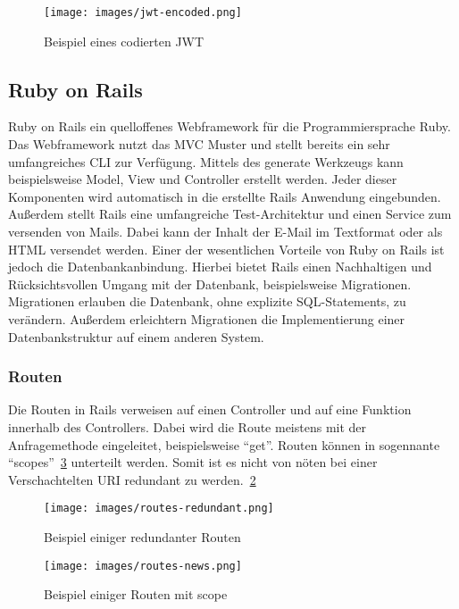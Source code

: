 \documentclass[11pt]{article}
\begin{document}
	\begin{figure}[h]
		\texttt{[image: images/jwt-encoded.png]}
		\caption{Beispiel eines codierten \gls{JWT} }
		\label{fig:jwt-encoded}
	\end{figure}
	
	\subsection{Ruby on Rails}
	\label{sec: rails}
	Ruby on Rails ein quelloffenes Webframework für die Programmiersprache Ruby. Das Webframework nutzt das \gls{MVC} Muster und stellt bereits ein sehr umfangreiches \gls{CLI} zur Verfügung. Mittels des generate Werkzeugs kann beispielsweise Model, View und Controller erstellt werden. Jeder dieser Komponenten wird automatisch in die erstellte Rails Anwendung eingebunden. Außerdem stellt Rails eine umfangreiche Test-Architektur und einen Service zum versenden von Mails. Dabei kann der Inhalt der E-Mail im Textformat oder als \gls{HTML} versendet werden. Einer der wesentlichen Vorteile von Ruby on Rails ist jedoch die Datenbankanbindung. Hierbei bietet Rails einen Nachhaltigen und Rücksichtsvollen Umgang mit der Datenbank, beispielsweise Migrationen. Migrationen erlauben die Datenbank, ohne explizite SQL-Statements, zu verändern. Außerdem erleichtern Migrationen die Implementierung einer Datenbankstruktur auf einem anderen System.
	
	
	\subsubsection{Routen}
	\label{sec: routen}
	Die Routen in Rails verweisen auf einen Controller und auf eine Funktion innerhalb des Controllers. Dabei wird die Route meistens mit der Anfragemethode eingeleitet, beispielsweise \enquote{get}. Routen können in sogennante \enquote{scopes}~\ref{fig:routes-scope} unterteilt werden. Somit ist es nicht von nöten bei einer Verschachtelten \gls{URI} redundant zu werden.~\ref{fig:routes-redundant}
	
	\begin{figure}
		\texttt{[image: images/routes-redundant.png]}
		\caption{Beispiel einiger redundanter Routen }
		\label{fig:routes-redundant}
	\end{figure}
	
	\begin{figure}
		\texttt{[image: images/routes-news.png]}
		\caption{Beispiel einiger Routen mit scope }
		\label{fig:routes-scope}
	\end{figure}
	
\end{document}
